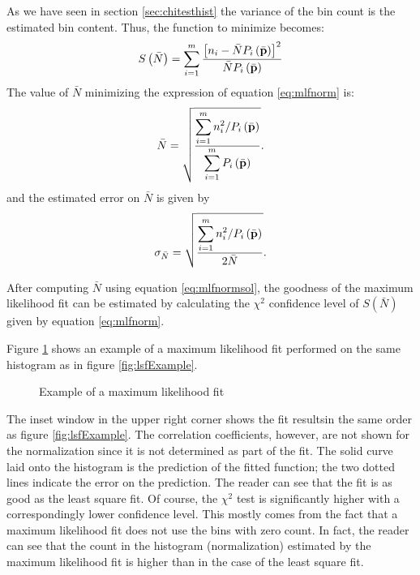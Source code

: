 \documentclass[twoside]{book}
\begin{document}
As we have seen in section \ref{sec:chitesthist} the variance of
the bin count is the estimated bin content. Thus, the function to
minimize becomes:
\begin{equation}
\label{eq:mlfnorm}
S\left(\bar{N}\right)=\sum_{i=1}^m{\displaystyle\left[n_i-\bar{N}
P_i\left(\bar{\bf p}\right)\right]^2
\over\displaystyle\bar{N}P_i\left(\bar{\bf p}\right)}
\end{equation}
The value of $\bar{N}$ minimizing the expression of equation
\ref{eq:mlfnorm} is:
\begin{equation}
\label{eq:mlfnormsol}
\bar{N}=\sqrt{{\displaystyle\sum_{i=1}^m
n_i^2 / P_i\left(\bar{\bf p}\right) \over\displaystyle\sum_{i=1}^m
P_i\left(\bar{\bf p}\right)}}.
\end{equation}
and the estimated error on $\bar{N}$ is given by
\begin{equation}
\label{eq:mlfnormsigma}
\sigma_{\bar{N}}=\sqrt{{\displaystyle\sum_{i=1}^m n_i^2 /
P_i\left(\bar{\bf p}\right) \over\displaystyle 2 \bar{N}}}.
\end{equation}

After computing $\bar{N}$ using equation \ref{eq:mlfnormsol}, the
goodness of the maximum likelihood fit can be estimated by
calculating the $\chi^2$ confidence level of
$S\left(\bar{N}\right)$ given by equation \ref{eq:mlfnorm}.

Figure \ref{fig:mlfExample} shows an example of a maximum
likelihood fit performed on the same histogram as in figure
\ref{fig:lsfExample}.
\begin{figure}
\center{}
\caption{Example of a maximum likelihood
fit}\label{fig:mlfExample}
\end{figure}
The inset window in the upper right corner shows the fit resultsin
the same order as figure \ref{fig:lsfExample}. The correlation
coefficients, however, are not shown for the normalization since
it is not determined as part of the fit. The solid curve laid onto
the histogram is the prediction of the fitted function; the two
dotted lines indicate the error on the prediction. The reader can
see that the fit is as good as the least square fit. Of course,
the $\chi^2$ test is significantly higher with a correspondingly
lower confidence level. This mostly comes from the fact that a
maximum likelihood fit does not use the bins with zero count. In
fact, the reader can see that the count in the histogram
(normalization) estimated by the maximum likelihood fit is higher
than in the case of the least square fit.
\end{document}
